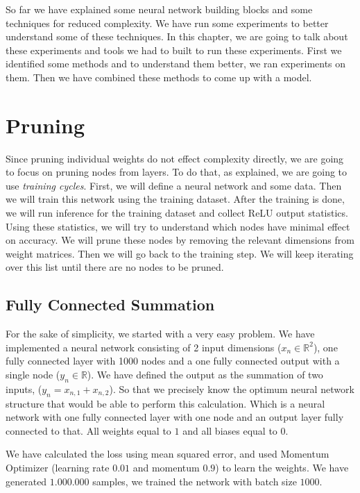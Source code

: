 So far we have explained some neural network building blocks and some techniques for reduced complexity. We have run some experiments to better understand some of these techniques. In this chapter, we are going to talk about these experiments and tools we had to built to run these experiments. First we identified some methods and to understand them better, we ran experiments on them. Then we have combined these methods to come up with a model. 

\section{Pruning}
Since pruning individual weights do not effect complexity directly, we are going to focus on pruning nodes from layers. To do that, as \cite{Hu:2016aa} explained, we are going to use \textit{training cycles}. First, we will define a neural network and some data. Then we will train this network using the training dataset. After the training is done, we will run inference for the training dataset and collect ReLU output statistics. Using these statistics, we will try to understand which nodes have minimal effect on accuracy. We will prune these nodes by removing the relevant dimensions from weight matrices. Then we will go back to the training step. We will keep iterating over this list until there are no nodes to be pruned.

\subsection{Fully Connected Summation}
For the sake of simplicity, we started with a very easy problem. We have implemented a neural network consisting of 2 input dimensions ($x_n \in \mathbb{R}^{2}$), one fully connected layer with 1000 nodes and a one fully connected output with a single node ($y_n \in \mathbb{R}$). We have defined the output as the summation of two inputs, ($y_n = x_{n,1} + x_{n,2}$). So that we precisely know the optimum neural network structure that would be able to perform this calculation. Which is a neural network with one fully connected layer with one node and an output layer fully connected to that. All weights equal to $1$ and all biases equal to $0$.

We have calculated the loss using mean squared error, and used Momentum Optimizer (learning rate $0.01$ and momentum $0.9$) to learn the weights. We have generated $1.000.000$ samples, we trained the network with batch size $1000$.

